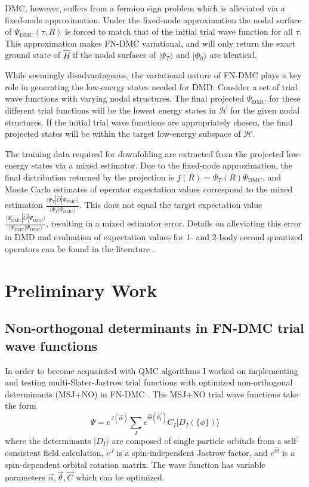 \documentclass[12pt]{article}
\begin{document}
DMC, however, suffers from a fermion sign problem which is alleviated via a fixed-node approximation.
Under the fixed-node approximation the nodal surface of $\Psi_\text{DMC}(\tau, R)$ is forced to match that of the initial trial wave function for all $\tau$.
This approximation makes FN-DMC variational, and will only return the exact ground state of $\hat{H}$ if the nodal surfaces of $|\Psi_T\rangle$ and $|\Phi_0\rangle$ are identical.

While seemingly disadvantageous, the variational nature of FN-DMC plays
a key role in generating the low-energy states needed for DMD.
Consider a set of trial wave functions with varying nodal structures.
The final projected $\Psi_\text{DMC}$ for these different trial functions will be the lowest energy states in $\mathcal{H}$ for the given nodal structures.
If the initial trial wave functions are appropriately chosen, the final projected states will be within the target low-energy subspace of $\mathcal{H}$.

The training data required for downfolding are extracted from the projected low-energy states via a mixed estimator.
Due to the fixed-node approximation, the final distribution returned by the projection is $f(R) = \Psi_T(R) \Psi_\text{DMC}$, and Monte Carlo estimates of operator expectation values correspond to the mixed estimation $\frac{\langle \Psi_T | \hat{O} | \Psi_\text{DMC} \rangle}{\langle \Psi_T | \Psi_\text{DMC}\rangle}$. 
This does not equal the target expectation value $\frac{\langle \Psi_\text{DMC} | \hat{O} | \Psi_\text{DMC} \rangle}{\langle \Psi_\text{DMC} | \Psi_\text{DMC}\rangle}$, resulting in a mixed estimator error.
Details on alleviating this error in DMD and evaluation of expectation values for 1- and 2-body second quantized operators can be found in the literature \cite{Wagner2015, Wagner2017}.
\section{Preliminary Work}
\subsection{Non-orthogonal determinants in FN-DMC trial wave functions}
In order to become acquainted with QMC algorithms I worked on implementing and testing multi-Slater-Jastrow trial functions with optimized non-orthogonal determinants (MSJ+NO) in FN-DMC \cite{doi:10.1063/1.5052906}.
The MSJ+NO trial wave functions take the form
\begin{equation}
\Psi=e^{J(\vec{\alpha})} \sum_I e^{\hat{\Theta}(\vec{\theta_I})} C_I |D_I (\{ \phi\})\rangle
\end{equation}
where the determinants $|D_I\rangle$ are composed of single particle orbitals from a self-consistent field calculation, $e^J$ is a spin-independent Jastrow factor, and $e^{\hat{\Theta}}$ is a spin-dependent orbital rotation matrix.
The wave function has variable parameters $\vec{\alpha}, \vec{\theta}, \vec{C}$ which can be optimized.
\end{document}
